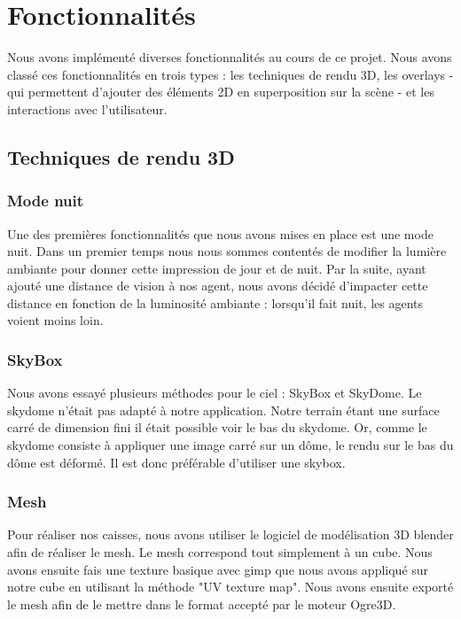 \section{Fonctionnalités}

Nous avons implémenté diverses fonctionnalités au cours de ce projet. Nous
avons classé ces fonctionnalités en trois types : les techniques de rendu 3D,
les overlays - qui permettent d'ajouter des éléments 2D en superposition sur
la scène - et les interactions avec l'utilisateur.

\subsection{Techniques de rendu 3D}

\subsubsection{Mode nuit}
Une des premières fonctionnalités que nous avons mises en place est une mode
nuit. Dans un premier temps nous nous sommes contentés de modifier la lumière
ambiante pour donner cette impression de jour et de nuit. Par la suite, ayant
ajouté une distance de vision à nos agent, nous avons décidé d'impacter cette
distance en fonction de la luminosité ambiante : lorsqu'il fait nuit, les
agents voient moins loin.

\subsubsection{SkyBox}
Nous avons essayé plusieurs méthodes pour le ciel : SkyBox et SkyDome. Le
skydome n'était pas adapté à notre application. Notre terrain étant une
surface carré de dimension fini il était possible voir le bas du skydome.
Or, comme le skydome consiste à appliquer une image carré sur un dôme, le
rendu sur le bas du dôme est déformé. Il est donc préférable d'utiliser une
skybox.

\subsubsection{Mesh}
Pour réaliser nos caisses, nous avons utiliser le logiciel de modélisation 3D
blender afin de réaliser le mesh. Le mesh correspond tout simplement à un
cube. Nous avons ensuite fais une texture basique avec gimp que nous avons
appliqué sur notre cube en utilisant la méthode "UV texture map".
Nous avons ensuite exporté le mesh afin de le mettre dans le format
accepté par le moteur Ogre3D.


